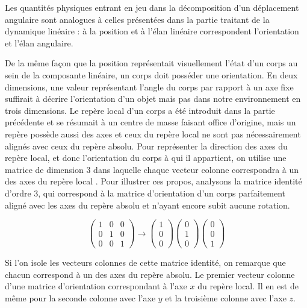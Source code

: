 Les quantités physiques entrant en jeu dans la décomposition d'un
déplacement angulaire sont analogues à celles présentées dans la
partie traitant de la dynamique linéaire : à la position et à l'élan
linéaire correspondent l'orientation et l'élan angulaire.

De la même façon que la position représentait visuellement l'état d'un
corps au sein de la composante linéaire, un corps doit posséder une
orientation. En deux dimensions, une valeur représentant l'angle du
corps par rapport à un axe fixe suffirait à décrire l'orientation d'un
objet mais pas dans notre environnement en trois dimensions. Le repère
local d'un corps a été introduit dans la partie précédente et se
résumait à un centre de masse faisant office d'origine, mais un repère
possède aussi des axes et ceux du repère local ne sont pas
nécessairement alignés avec ceux du repère absolu. Pour représenter la
direction des axes du repère local, et donc l'orientation du corps à
qui il appartient, on utilise une matrice de dimension 3 dans laquelle
chaque vecteur colonne correspondra à un des axes du repère local
\cite{witkit}. Pour illustrer ces propos, analysons la matrice
identité d'ordre 3, qui correspond à la matrice d'orientation d'un
corps parfaitement aligné avec les axes du repère absolu et n'ayant
encore subit aucune rotation.

\[
\begin{pmatrix}
  1 & 0 & 0 \\ 0 & 1 & 0 \\ 0 & 0 & 1
\end{pmatrix}
\rightarrow
\begin{pmatrix}
  1 \\ 0 \\ 0
\end{pmatrix}
\begin{pmatrix}
  0 \\ 1 \\ 0
\end{pmatrix}
\begin{pmatrix}
  0 \\ 0 \\ 1
\end{pmatrix}
\]

Si l'on isole les vecteurs colonnes de cette matrice identité, on
remarque que chacun correspond à un des axes du repère absolu. Le
premier vecteur colonne d'une matrice d'orientation correspondant à
l'axe $x$ du repère local. Il en est de même pour la seconde colonne
avec l'axe $y$ et la troisième colonne avec l'axe $z$.

